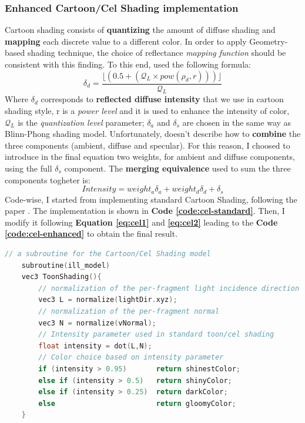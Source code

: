 \subsubsection{Enhanced Cartoon/Cel Shading implementation}
Cartoon shading consists of \textbf{quantizing} the amount of diffuse shading and \textbf{mapping} each discrete value to a different color. In order to apply Geometry-based shading technique, the choice of reflectance \textit{mapping function} should be consistent with this finding. To this end, \cite{referencePaper} used the following formula:
\begin{equation}\label{eq:cel1}
	\delta_d = \frac{\lfloor(0.5 + (\mathcal{Q}_L \times pow(\rho_d,r)))\rfloor}{\mathcal{Q}_L}
\end{equation}
Where $\delta_d$ corresponds to \textbf{reflected diffuse intensity} that we use in cartoon shading style, r is a \textit{power level} and it is used to enhance the intensity of color, $\mathcal{Q}_L$ is the \textit{quantization level} parameter; $\delta_a$ and $\delta_s$ are chosen in the same way as Blinn-Phong shading model.\newline
Unfortunately, \cite{referencePaper} doesn't describe how to \textbf{combine} the three components (ambient, diffuse and specular). For this reason, I choosed to introduce in the final equation two weights, for ambient and diffuse components, using the full $\delta_s$ component. \newline
The \textbf{merging equivalence} used to sum the three components togheter is:
\begin{equation}\label{eq:cel2}
	Intensity = weight_a\delta_a + weight_d\delta_d + \delta_s
\end{equation}
Code-wise, I started from implementing standard Cartoon Shading, following the paper \cite{ToonPaper}. The implementation is shown in \textbf{Code \ref{code:cel-standard}}. Then, I modify it following \textbf{Equation \ref{eq:cel1}} and \textbf{\ref{eq:cel2}} leading to the \textbf{Code \ref{code:cel-enhanced}} to obtain the final result.
\begin{lstlisting}[language=C++, caption=Standard Cartoon shading subroutine implemented in fragment shader,label={code:cel-standard}]
	// a subroutine for the Cartoon/Cel Shading model
	subroutine(ill_model)
	vec3 ToonShading(){
		// normalization of the per-fragment light incidence direction
		vec3 L = normalize(lightDir.xyz);
		// normalization of the per-fragment normal
		vec3 N = normalize(vNormal);
		// Intensity parameter used in standard toon/cel shading
		float intensity = dot(L,N);
		// Color choice based on intensity parameter
		if (intensity > 0.95)       return shinestColor;
		else if (intensity > 0.5)   return shinyColor;
		else if (intensity > 0.25)  return darkColor;
		else                        return gloomyColor;
	}
\end{lstlisting}
